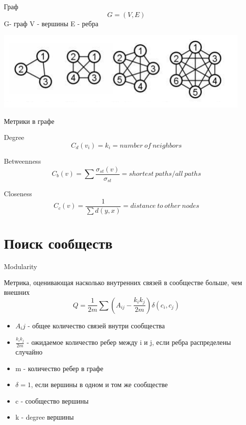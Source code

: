\documentclass[10pt]{beamer}
\begin{document}
\begin{frame}{Граф}
\[
G = \left(V, E\right)
\]
G- граф
V - вершины
E - ребра
\begin{center}
\includegraphics[scale=0.5]{images/1.png}
\end{center}

\end{frame}

\begin{frame}{Метрики в графе}

\begin{block}{Degree}
\[
C_d\left(v_i\right) = k_i = number\ of\ neighbors
\]
\end{block}

\begin{block}{Betweenness}
\[
C_b\left(v\right) = \sum\frac{\sigma_{st}(v)}{\sigma_{st}} = 
shortest\ paths / all\ paths
\]
\end{block}
	
\begin{block}{Closeness}
\[
C_c\left(v\right) = \frac{1}{\sum d(y,x)} = distance\ to\ other\ nodes
\]
\end{block}

\end{frame}

\section{Поиск сообществ}

\begin{frame}{Modularity}



\begin{block}{Метрика, оценивающая насколько внутренних связей в сообществе больше, чем внешних}
\[
Q = \frac{1}{2m} \sum\left(A_{ij} - \frac{k_i k_j}{2m}\right)\delta\left(c_i,c_j\right)
\]
\end{block}

\begin{itemize}
\item $A_ij$ - общее количество связей внутри сообщества
\item $\frac{k_i k_j}{2m}$ - ожидаемое количество ребер между i и j, если ребра распределены случайно
\item m - количество ребер в графе
\item $\delta = 1$, если вершины в одном и том же сообществе
\item c - сообщество вершины
\item k - degree вершины
\end{itemize}

\end{frame}
\end{document}
